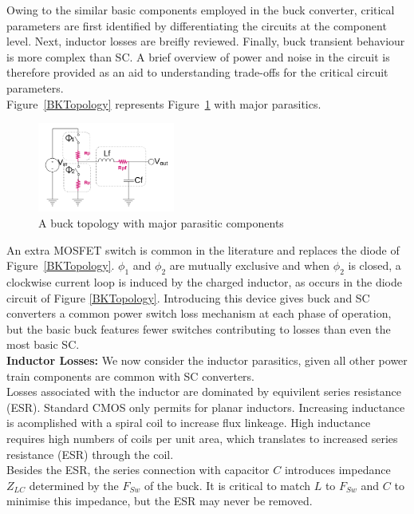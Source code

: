 \documentclass[letterpaper,twocolumn,10pt]{article}
\begin{document}
Owing to the similar basic components employed in the buck converter, critical parameters are first identified by differentiating the circuits at the component level. Next, inductor losses are breifly reviewed. Finally, buck transient behaviour is more complex than SC. A brief overview of power and noise in the circuit is therefore provided as an aid to understanding trade-offs for the critical circuit parameters.\\
Figure~\ref{BKTopology} represents Figure~\ref{NonIdealBuckTopology} with major parasitics.\\
\begin{figure}[here]
\includegraphics[width=0.4\textwidth]{BuckTopologyParasitics}
\caption{A buck topology with major parasitic components}
\label{NonIdealBuckTopology}
\end{figure}
An extra MOSFET switch is common in the literature and replaces the diode of Figure~\ref{BKTopology}. $\phi_1$ and $\phi_2$ are mutually exclusive and when $\phi_2$ is closed, a clockwise current loop is induced by the charged inductor, as occurs in the diode circuit of Figure \ref{BKTopology}. Introducing this device gives buck and SC converters a common power switch loss mechanism at each phase of operation, but the basic buck features fewer switches contributing to losses than even the most basic SC.\\
\textbf{Inductor Losses: }We now consider the inductor parasitics, given all other power train components are common with SC converters.\\
Losses associated with the inductor are dominated by equivilent series resistance (ESR). Standard CMOS only permits for planar inductors. Increasing inductance is acomplished with a spiral coil to increase flux linkeage. High inductance requires high numbers of coils per unit area, which translates to increased series resistance (ESR) through the coil.\\
Besides the ESR, the series connection with capacitor $C$ introduces impedance $Z_{LC}$ determined by the $F_{Sw}$ of the buck. It is critical to match $L$ to $F_{Sw}$ and $C$ to minimise this impedance, but the ESR may never be removed.\\  
\end{document}
